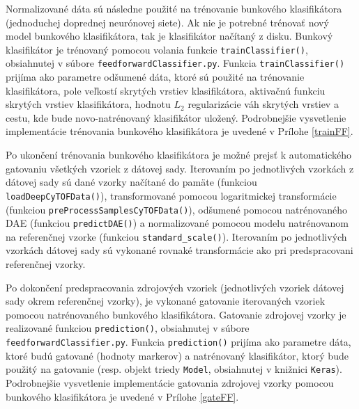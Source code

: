 \begin{sloppypar}
Normalizované dáta sú následne použité na trénovanie bunkového klasifikátora (jednoduchej doprednej neurónovej siete). Ak nie je potrebné trénovať nový model bunkového klasifikátora, tak je klasifikátor načítaný z disku. Bunkový klasifikátor je trénovaný pomocou volania funkcie \texttt{trainClassifier()}, obsiahnutej v súbore \texttt{feedforwardClassifier.py}. Funkcia \texttt{trainClassifier()} prijíma ako parametre odšumené dáta, ktoré sú použité na trénovanie klasifikátora, pole veľkostí skrytých vrstiev klasifikátora, aktivačnú funkciu skrytých vrstiev klasifikátora, hodnotu $L_2$ regularizácie váh skrytých vrstiev a cestu, kde bude novo-natrénovaný klasifikátor uložený. Podrobnejšie vysvetlenie implementácie trénovania bunkového klasifikátora je uvedené v Prílohe \ref{trainFF}.
\end{sloppypar}

\begin{sloppypar}
Po ukončení trénovania bunkového klasifikátora je možné prejsť k automatického gatovaniu všetkých vzoriek z dátovej sady. Iterovaním po jednotlivých vzorkách z dátovej sady sú dané vzorky načítané do pamäte (funkciou \texttt{loadDeepCyTOFData()}), transformované pomocou logaritmickej transformácie (funkciou \texttt{preProcessSamplesCyTOFData()}), odšumené pomocou natrénovaného DAE (funkciou \texttt{predictDAE()}) a normalizované pomocou modelu natrénovanom na referenčnej vzorke (funkciou \texttt{standard_scale()}). Iterovaním po jednotlivých vzorkách dátovej sady sú vykonané rovnaké transformácie ako pri predspracovani referenčnej vzorky. 
\end{sloppypar}

\begin{sloppypar}
Po dokončení predspracovania zdrojových vzoriek (jednotlivých vzoriek dátovej sady okrem referenčnej vzorky), je vykonané gatovanie iterovaných vzoriek pomocou natrénovaného bunkového klasifikátora. Gatovanie zdrojovej vzorky je realizované funkciou \texttt{prediction()}, obsiahnutej v súbore \texttt{feedforwardClassifier.py}. Funkcia \texttt{prediction()} prijíma ako parametre dáta, ktoré budú gatované (hodnoty markerov) a natrénovaný klasifikátor, ktorý bude použitý na gatovanie (resp. objekt triedy \texttt{Model}, obsiahnutej v knižnici \texttt{Keras}). Podrobnejšie vysvetlenie implementácie gatovania zdrojovej vzorky pomocou bunkového klasifikátora je uvedené v Prílohe \ref{gateFF}.
\end{sloppypar}

